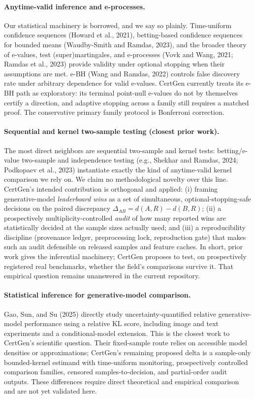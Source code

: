 \paragraph{Anytime-valid inference and e-processes.}
Our statistical machinery is borrowed, and we say so plainly. Time-uniform
confidence sequences (Howard et al., 2021), betting-based confidence sequences
for bounded means (Waudby-Smith and Ramdas, 2023), and the broader theory of
e-values, test (super)martingales, and e-processes (Vovk and Wang, 2021; Ramdas
et al., 2023) provide validity under optional stopping when their assumptions
are met. e-BH (Wang and Ramdas, 2022) controls false discovery rate under
arbitrary dependence for valid e-values. CertGen currently treats its e-BH path
as exploratory: its terminal point-null e-values do not by themselves certify a
direction, and adaptive stopping across a family still requires a matched proof.
The conservative primary family protocol is Bonferroni correction.

\paragraph{Sequential and kernel two-sample testing (closest prior work).}
The most direct neighbors are sequential two-sample and kernel tests:
betting/e-value two-sample and independence testing (e.g., Shekhar and Ramdas,
2024; Podkopaev et al., 2023) instantiate exactly the kind of anytime-valid
kernel comparison we rely on. We claim no methodological novelty over this line.
CertGen's intended contribution is orthogonal and applied: (i) framing generative-model
\emph{leaderboard wins} as a set of simultaneous, optional-stopping-safe
decisions on the paired discrepancy $\Delta_{AB}=d(A,R)-d(B,R)$; (ii) a
prospectively multiplicity-controlled \emph{audit} of how many reported wins are statistically decided
at the sample sizes actually used; and (iii) a reproducibility discipline
(provenance ledger, preprocessing lock, reproduction gate) that makes such an
audit defensible on released samples and feature caches. In short, prior work
gives the inferential machinery; CertGen proposes to test, on prospectively
registered real benchmarks, whether the field's comparisons survive it. That
empirical question remains unanswered in the current repository.

\paragraph{Statistical inference for generative-model comparison.}
Gao, Sun, and Su (2025) directly study uncertainty-quantified relative
generative-model performance using a relative KL score, including image and
text experiments and a conditional-model extension. This is the closest work to
CertGen's scientific question. Their fixed-sample route relies on accessible
model densities or approximations; CertGen's remaining proposed delta is a
sample-only bounded-kernel estimand with time-uniform monitoring, prospectively
controlled comparison families, censored samples-to-decision, and partial-order
audit outputs. These differences require direct theoretical and empirical
comparison and are not yet validated here.

